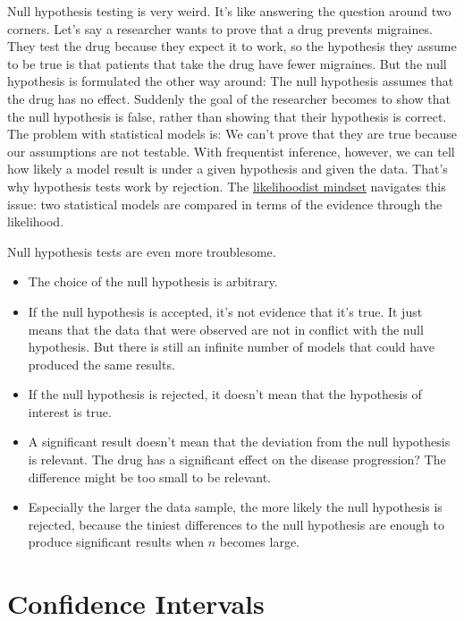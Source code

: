 \documentclass[
  10pt,
]{scrbook}
\providecommand{\tightlist}{%
  \setlength{\itemsep}{0pt}\setlength{\parskip}{0pt}}
\begin{document}
Null hypothesis testing is very weird.
It's like answering the question around two corners.
Let's say a researcher wants to prove that a drug prevents migraines.
They test the drug because they expect it to work, so the hypothesis they assume to be true is that patients that take the drug have fewer migraines.
But the null hypothesis is formulated the other way around:
The null hypothesis assumes that the drug has no effect.
Suddenly the goal of the researcher becomes to show that the null hypothesis is false, rather than showing that their hypothesis is correct.
The problem with statistical models is: We can't prove that they are true because our assumptions are not testable.
With frequentist inference, however, we can tell how likely a model result is under a given hypothesis and given the data.
That's why hypothesis tests work by rejection.
The \protect\hyperlink{likelihoodism}{likelihoodist mindset} navigates this issue:
two statistical models are compared in terms of the evidence through the likelihood.

Null hypothesis tests are even more troublesome.

\begin{itemize}
\tightlist
\item
  The choice of the null hypothesis is arbitrary.
\item
  If the null hypothesis is accepted, it's not evidence that it's true. It just means that the data that were observed are not in conflict with the null hypothesis. But there is still an infinite number of models that could have produced the same results.
\item
  If the null hypothesis is rejected, it doesn't mean that the hypothesis of interest is true.
\item
  A significant result doesn't mean that the deviation from the null hypothesis is relevant. The drug has a significant effect on the disease progression? The difference might be too small to be relevant.
\item
  Especially the larger the data sample, the more likely the null hypothesis is rejected, because the tiniest differences to the null hypothesis are enough to produce significant results when \(n\) becomes large.
\end{itemize}

\hypertarget{confidence-intervals}{%
\section{Confidence Intervals}\label{confidence-intervals}}
\end{document}
